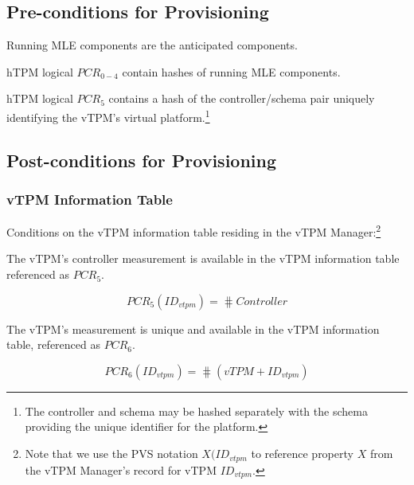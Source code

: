 \documentclass[10pt]{article}
\begin{document}
\subsection*{Pre-conditions for Provisioning}

\begin{pre}
  Running MLE components are the anticipated components.
\end{pre}

\begin{pre}
  hTPM logical $PCR_{0-4}$ contain hashes of running MLE components.
\end{pre}

\begin{pre}
  hTPM logical $PCR_5$ contains a hash of the controller/schema pair
  uniquely identifying the vTPM's virtual platform.\footnote{The
    controller and schema may be hashed separately with the schema
    providing the unique identifier for the platform.}
\end{pre}

\subsection*{Post-conditions for Provisioning}

\subsubsection*{vTPM Information Table}

Conditions on the vTPM information table residing in the vTPM
Manager:\footnote{Note that we use the PVS notation $X(ID_{vtpm}$ to
  reference property $X$ from the vTPM Manager's record for vTPM $ID_{vtpm}$.}


\begin{post}
  The vTPM's controller measurement is available in the vTPM
  information table referenced as $PCR_5$.

  \[PCR_5(ID_{vtpm}) = \hash{Controller}\]

\end{post}

\begin{post}
  The vTPM's measurement is unique and available in the vTPM
  information table, referenced as $PCR_6$.

  \[PCR_6(ID_{vtpm}) = \hash{(vTPM+ID_{vtpm})}\]

\end{post}
\end{document}
